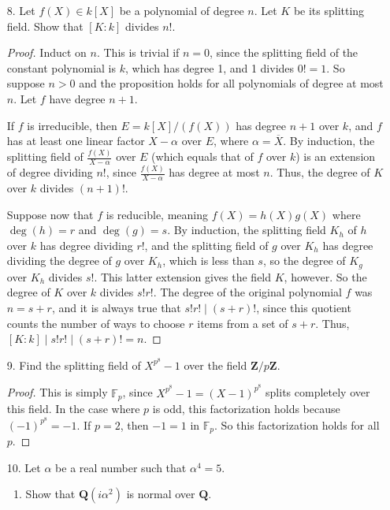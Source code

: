 \documentclass[10pt]{article}
\newcommand{\Q}{\mathbf{Q}}
\newcommand{\Z}{\mathbf{Z}}
\renewcommand{\bar}{\overline}
\begin{document}
\begin{enumerate}
\item[8.] Let $f(X) \in k[X]$ be a polynomial of degree $n$.  Let $K$ be its splitting field.  Show that $[K:k]$ divides $n!$.

\begin{proof}
Induct on $n$.  This is trivial if $n=0$, since the splitting field of the constant polynomial is $k$, which has degree 1, and 1 divides $0! = 1$.  So suppose $n > 0$ and the proposition holds for all polynomials of degree at most $n$.  Let $f$ have degree $n+1$.

If $f$ is irreducible, then $E = k[X] / (f(X))$ has degree $n+1$ over $k$, and $f$ has at least one linear factor $X - \alpha$ over $E$, where $\alpha = \bar{X}$.  By induction, the splitting field of $\frac{f(X)}{X-\alpha}$ over $E$ (which equals that of $f$ over $k$) is an extension of degree dividing $n!$, since $\frac{f(X)}{X-\alpha}$ has degree at most $n$.  Thus, the degree of $K$ over $k$ divides $(n+1)!$.

Suppose now that $f$ is reducible, meaning $f(X) = h(X)g(X)$ where $\deg(h) = r$ and $\deg(g) = s$.  By induction, the splitting field $K_h$ of $h$ over $k$ has degree dividing $r!$, and the splitting field of $g$ over $K_h$ has degree dividing the degree of $g$ over $K_h$, which is less than $s$, so the degree of $K_g$ over $K_h$ divides $s!$.  This latter extension gives the field $K$, however.  So the degree of $K$ over $k$ divides $s!r!$.  The degree of the original polynomial $f$ was $n=s+r$, and it is always true that $s!r! \mid (s+r)!$, since this quotient counts the number of ways to choose $r$ items from a set of $s+r$.  Thus, $[K:k] \mid s!r! \mid (s+r)! = n$.
\end{proof}

\item[9.] Find the splitting field of $X^{p^8} - 1$ over the field $\Z / p\Z$.

\begin{proof}
This is simply $\mathbb{F}_{p}$, since $X^{p^8} - 1 = (X-1)^{p^8}$ splits completely over this field.  In the case where $p$ is odd, this factorization holds because $(-1)^{p^8} = -1$.  If $p = 2$, then $-1 = 1$ in $\mathbb{F}_p$.  So this factorization holds for all $p$.
\end{proof}

\item[10.]Let $\alpha$ be a real number such that $\alpha^4 = 5$.
\begin{enumerate}
\item Show that $\Q(i\alpha^2)$ is normal over $\Q$.


\end{enumerate}
\end{enumerate}
\end{document}

